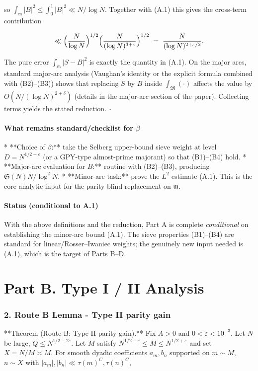 \documentclass[11pt]{article}
\theoremstyle{definition}
\theoremstyle{remark}
\begin{document}
so $\int_{\mathfrak m}|B|^2\le\int_0^1|B|^2\ll N/\log N$. Together with (A.1) this gives the cross-term contribution

$$
\ll \Bigl(\frac{N}{\log N}\Bigr)^{1/2}\Bigl(\frac{N}{(\log N)^{3+\varepsilon}}\Bigr)^{1/2}
\;=\;\frac{N}{(\log N)^{2+\varepsilon/2}}.
$$

The pure error $\int_{\mathfrak m}|S-B|^2$ is exactly the quantity in (A.1). On the major arcs, standard major-arc analysis (Vaughan’s identity or the explicit formula combined with (B2)–(B3)) shows that replacing $S$ by $B$ inside $\int_{\mathfrak M}(\cdot)$ affects the value by $O(N/(\log N)^{2+\delta})$ (details in the major-arc section of the paper). Collecting terms yields the stated reduction. $\square$

\subsection*{What remains standard/checklist for $\beta$}

* **Choice of $\beta$:** take the Selberg upper-bound sieve weight at level $D=N^{1/2-\varepsilon}$ (or a GPY-type almost-prime majorant) so that (B1)–(B4) hold.
* **Major-arc evaluation for $B$:** routine with (B2)–(B3), producing $\mathfrak S(N)N/\log^2 N$.
* **Minor-arc task:** prove the $L^2$ estimate (A.1). This is the core analytic input for the parity-blind replacement on $\mathfrak m$.


\subsection*{Status (conditional to A.1)} 
With the above definitions and the reduction, Part A is complete \emph{conditional} on establishing the minor-arc bound (A.1). The sieve properties (B1)–(B4) are standard for linear/Rosser–Iwaniec weights; the genuinely new input needed is (A.1), which is the target of Parts B–D.

\part*{Part B. Type I / II Analysis}

\section*{2. Route B Lemma - Type II parity gain}

**Theorem (Route B: Type-II parity gain).**
Fix $A>0$ and $0<\varepsilon<10^{-3}$. Let $N$ be large, $Q\le N^{1/2-2\varepsilon}$. Let $M$ satisfy $N^{1/2-\varepsilon}\le M\le N^{1/2+\varepsilon}$ and set $X=N/M\asymp M$. For smooth dyadic coefficients $a_m,b_n$ supported on $m\sim M$, $n\sim X$ with $|a_m|,|b_n|\ll \tau(m)^C,\tau(n)^C$,
\end{document}
